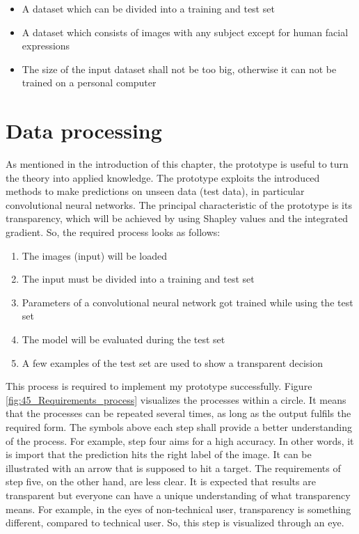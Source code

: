 \begin{itemize}
	\item A dataset which can be divided into a training and test set
	\item A dataset which consists of images with any subject except for human facial expressions
	\item The size of the input dataset shall not be too big, otherwise it can not be trained on a personal computer 
\end{itemize}

\section{Data processing}

As mentioned in the introduction of this chapter, the prototype is useful to turn the theory into applied knowledge. The prototype exploits the introduced methods to make predictions on unseen data (test data), in particular convolutional neural networks. The principal characteristic of the prototype is its transparency, which will be achieved by using Shapley values and the integrated gradient. So, the required process looks as follows:

\begin{enumerate}
\item The images (input) will be loaded
\item The input must be divided into a training and test set
\item Parameters of a convolutional neural network got trained while using the test set
\item The model will be evaluated during the test set
\item A few examples of the test set are used to show a transparent decision 
\end{enumerate}

This process is required to implement my prototype successfully. Figure \ref{fig:45_Requirements_process} visualizes the processes within a circle. It means that the processes can be repeated several times, as long as the output fulfils the required form. The symbols above each step shall provide a better understanding of the process. For example, step four aims for a high accuracy. In other words, it is import that the prediction hits the right label of the image. It can be illustrated with an arrow that is supposed to hit a target. The requirements of step five, on the other hand, are less clear. It is expected that results are transparent but everyone can have a unique understanding of what transparency means. For example, in the eyes of non-technical user, transparency is something different, compared to technical user. So, this step is visualized through an eye. 

